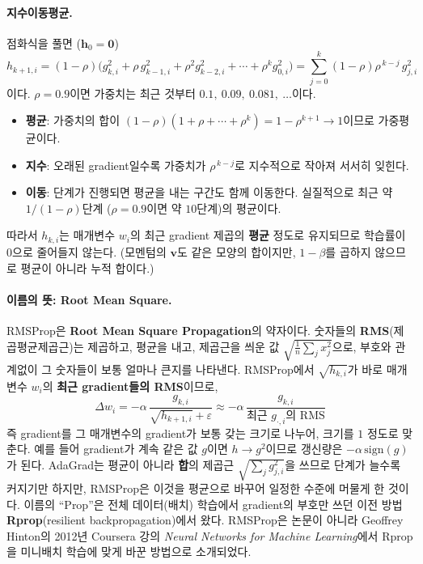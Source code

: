 \documentclass[11pt,a4paper]{article}
\begin{document}
\paragraph{지수이동평균.}
점화식을 풀면 ($\bm h_0=\bm 0$)
\[
h_{k+1,i}=(1-\rho)\bigl(g_{k,i}^2+\rho\,g_{k-1,i}^2+\rho^2g_{k-2,i}^2+\cdots+\rho^k g_{0,i}^2\bigr)
=\sum_{j=0}^{k}(1-\rho)\rho^{\,k-j}\,g_{j,i}^2
\]
이다. $\rho=0.9$이면 가중치는 최근 것부터 $0.1,\ 0.09,\ 0.081,\ \ldots$이다.
\begin{itemize}[leftmargin=1.8em]
\item \textbf{평균}: 가중치의 합이 $(1-\rho)(1+\rho+\cdots+\rho^k)=1-\rho^{k+1}\to1$이므로 가중평균이다.
\item \textbf{지수}: 오래된 gradient일수록 가중치가 $\rho^{\,k-j}$로 지수적으로 작아져 서서히 잊힌다.
\item \textbf{이동}: 단계가 진행되면 평균을 내는 구간도 함께 이동한다.
실질적으로 최근 약 $1/(1-\rho)$단계 ($\rho=0.9$이면 약 $10$단계)의 평균이다.
\end{itemize}
따라서 $h_{k,i}$는 매개변수 $w_i$의 최근 gradient 제곱의 \textbf{평균} 정도로 유지되므로 학습률이 $0$으로 줄어들지 않는다.
(모멘텀의 $\bm v$도 같은 모양의 합이지만, $1-\beta$를 곱하지 않으므로 평균이 아니라 누적 합이다.)

\paragraph{이름의 뜻: Root Mean Square.}
RMSProp은 \textbf{Root Mean Square Propagation}의 약자이다.
숫자들의 \textbf{RMS}(제곱평균제곱근)는 제곱하고, 평균을 내고, 제곱근을 씌운 값
$\sqrt{\frac1n\sum_j x_j^2}$으로, 부호와 관계없이 그 숫자들이 보통 얼마나 큰지를 나타낸다.
RMSProp에서 $\sqrt{h_{k,i}}$가 바로 매개변수 $w_i$의 \textbf{최근 gradient들의 RMS}이므로,
\[
\Delta w_i=-\alpha\,\frac{g_{k,i}}{\sqrt{h_{k+1,i}}+\varepsilon}
\approx-\alpha\,\frac{g_{k,i}}{\text{최근 }g_{\cdot,i}\text{의 RMS}}
\]
즉 gradient를 그 매개변수의 gradient가 보통 갖는 크기로 나누어, 크기를 $1$ 정도로 맞춘다.
예를 들어 gradient가 계속 같은 값 $g$이면 $h\to g^2$이므로 갱신량은 $-\alpha\,\mathrm{sign}(g)$가 된다.
AdaGrad는 평균이 아니라 \textbf{합}의 제곱근 $\sqrt{\sum_j g_{j,i}^2}$을 쓰므로 단계가 늘수록 커지기만 하지만,
RMSProp은 이것을 평균으로 바꾸어 일정한 수준에 머물게 한 것이다.
이름의 ``Prop''은 전체 데이터(배치) 학습에서 gradient의 부호만 쓰던 이전 방법 \textbf{Rprop}(resilient backpropagation)에서 왔다.
RMSProp은 논문이 아니라 Geoffrey Hinton의 2012년 Coursera 강의
\emph{Neural Networks for Machine Learning}에서 Rprop을 미니배치 학습에 맞게 바꾼 방법으로 소개되었다.
\end{document}
